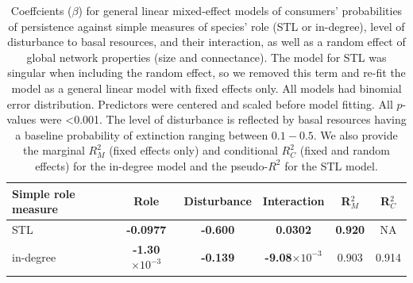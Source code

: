 \documentclass[12pt]{article}
\begin{document}
\begin{spacing}{2.0}
    \begin{table}[hb!]
        \caption{Coeffcients ($\beta$) for general linear mixed-effect models of consumers' probabilities of persistence against simple measures of species' role (STL or in-degree), level of disturbance to basal resources, and their interaction, as well as a random effect of global network properties (size and connectance). The model for STL was singular when including the random effect, so we removed this term and re-fit the model as a general linear model with fixed effects only. All models had binomial error distribution. Predictors were centered and scaled before model fitting. All $p$-values were \textless0.001. The level of disturbance is reflected by basal resources having a baseline probability of extinction ranging between $0.1 - 0.5$.  We also provide the marginal $R^2_M$ (fixed effects only) and conditional $R^2_C$ (fixed and random effects) for the in-degree model and the pseudo-$R^2$ for the STL model.}
        \label{tab:per_vs_TLdeg}
        \centering
        \begin{tabular}{l|c  c  c | c c  }
            Simple role measure & Role & Disturbance & Interaction & R$^2_M$ & R$^2_C$ \\
            \hline
            STL & \textbf{-0.0977} & \textbf{-0.600} & \textbf{0.0302} & \textbf{0.920} & NA \\
            in-degree & \textbf{-1.30$\times10^{-3}$} & \textbf{-0.139} & \textbf{-9.08$\times10^{-3}$} & 0.903 & 0.914 \\
        \end{tabular}
    \end{table}






\end{spacing}
\end{document}
